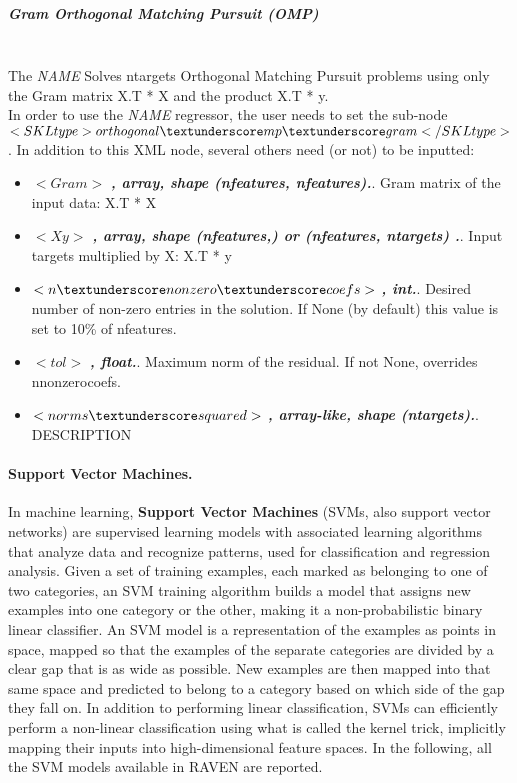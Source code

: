 \subparagraph{Gram Orthogonal Matching Pursuit (OMP)}
\mbox{}
\\The \textit{NAME} Solves n\textunderscore targets Orthogonal Matching Pursuit problems using only the Gram matrix X.T * X and the product X.T * y.
\\In order to use the \textit{NAME} regressor, the user needs to set the sub-node $<SKLtype>orthogonal\textunderscore mp\textunderscore gram</SKLtype>$.
In addition to this XML node, several others need (or not) to be inputted:
\begin{itemize}
  \item $<Gram>$ \textbf{\textit{, array, shape (n\textunderscore features, n\textunderscore features).}}. Gram matrix of the input data: X.T * X
  \item $<Xy>$ \textbf{\textit{, array, shape (n\textunderscore features,) or (n\textunderscore features, n\textunderscore targets) .}}. Input targets multiplied by X: X.T * y
  \item $<n\textunderscore nonzero\textunderscore coefs>$ \textbf{\textit{, int.}}. Desired number of non-zero entries in the solution. If None (by default) this value is set to 10\% of n\textunderscore features.
  \item $<tol>$ \textbf{\textit{, float.}}. Maximum norm of the residual. If not None, overrides n\textunderscore nonzero\textunderscore coefs.
  \item $<norms\textunderscore squared>$ \textbf{\textit{, array-like, shape (n\textunderscore targets).}}. DESCRIPTION
\end{itemize}

\paragraph{Support Vector Machines.}
\label{SVM}
In machine learning, \textbf{Support Vector Machines} (SVMs, also support vector networks) are supervised learning models with associated learning algorithms that analyze data and recognize patterns, used for classification and regression analysis. Given a set of training examples, each marked as belonging to one of two categories, an SVM training algorithm builds a model that assigns new examples into one category or the other, making it a non-probabilistic binary linear classifier. An SVM model is a representation of the examples as points in space, mapped so that the examples of the separate categories are divided by a clear gap that is as wide as possible. New examples are then mapped into that same space and predicted to belong to a category based on which side of the gap they fall on.
In addition to performing linear classification, SVMs can efficiently perform a non-linear classification using what is called the kernel trick, implicitly mapping their inputs into high-dimensional feature spaces.
In the following, all the SVM models available in RAVEN are reported.

